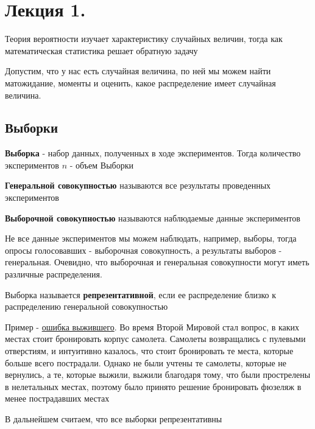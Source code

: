 \documentclass[12pt]{article}
\begin{document}
    \tableofcontents
    \clearpage




\section{Лекция 1.}

Теория вероятности изучает характеристику случайных величин, тогда как математическая статистика решает обратную задачу

Допустим, что у нас есть случайная величина, по ней мы можем найти матожидание, моменты и оценить,
какое распределение имеет случайная величина. 

\subsection{Выборки}

\Def \textbf{Выборка} - набор данных, полученных в ходе экспериментов. Тогда количество экспериментов $n$ - объем Выборки

\Defs \textbf{Генеральной совокупностью} называются все результаты проведенных экспериментов

\Defs \textbf{Выборочной совокупностью} называются наблюдаемые данные экспериментов

Не все данные экспериментов мы можем наблюдать, например, выборы, тогда опросы голосовавших - выборочная совокупность, а
результаты выборов - генеральная. Очевидно, что выборочная и генеральная совокупности могут иметь различные распределения.

\Defs Выборка называется \textbf{репрезентативной}, если ее распределение близко к распределению генеральной совокупностью

Пример - \href{https://ru.wikipedia.org/wiki/%D0%A1%D0%B8%D1%81%D1%82%D0%B5%D0%BC%D0%B0%D1%82%D0%B8%D1%87%D0%B5%D1%81%D0%BA%D0%B0%D1%8F_%D0%BE%D1%88%D0%B8%D0%B1%D0%BA%D0%B0_%D0%B2%D1%8B%D0%B6%D0%B8%D0%B2%D1%88%D0%B5%D0%B3%D0%BE}{ошибка выжившего}. Во время Второй Мировой стал вопрос, в каких местах стоит бронировать корпус самолета. Самолеты 
возвращались с пулевыми отверстиям, и интуитивно казалось, что стоит бронировать те места, которые больше
всего пострадали. Однако не были учтены те самолеты, которые не вернулись, а те, которые выжили, выжили благодаря тому, что были 
прострелены в нелетальных местах, поэтому было принято решение бронировать фюзеляж в менее пострадавших местах

В дальнейшем считаем, что все выборки репрезентативны
\end{document}
